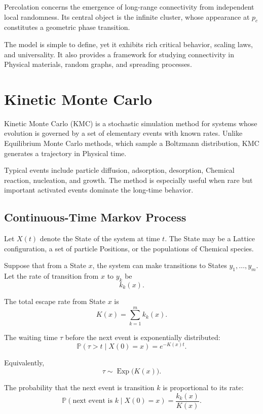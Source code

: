 \documentclass[a4paper, 10pt, onepage]{elegantbook}
\begin{document}
{Percolation concerns the emergence of long-range connectivity from independent
local randomness. Its central object is the infinite cluster, whose appearance
at \(p_c\) constitutes a geometric phase transition.

The model is simple to define, yet it exhibits rich critical behavior, scaling
laws, and universality. It also provides a  framework for studying
connectivity in Physical materials, random graphs, and spreading processes.

\newpage

\section{Kinetic Monte Carlo}

Kinetic Monte Carlo (KMC) is a stochastic simulation method for systems whose
evolution is governed by a set of elementary events with known rates. Unlike
Equilibrium Monte Carlo methods, which sample a Boltzmann distribution,
KMC generates a trajectory in Physical time.

Typical events include particle diffusion, adsorption, desorption, Chemical
reaction, nucleation, and growth. The method is especially useful when rare but
important activated events dominate the long-time behavior.

\subsection{Continuous-Time Markov Process}

Let \(X(t)\) denote the State of the system at time \(t\). The State may be a
Lattice configuration, a set of particle Positions, or the populations of
Chemical species.

Suppose that from a State \(x\), the system can make transitions to States
\(y_1,\ldots,y_m\). Let the rate of transition from \(x\) to \(y_k\) be
\[
k_k(x).
\]

The total escape rate from State \(x\) is
\[
K(x)
=
\sum_{k=1}^m k_k(x).
\]

The waiting time \(\tau\) before the next event is exponentially distributed:
\[
\mathbb P(\tau>t\mid X(0)=x)
=
e^{-K(x)t}.
\]

Equivalently,
\[
\tau
\sim
\operatorname{Exp}\bigl(K(x)\bigr).
\]

The probability that the next event is transition \(k\) is proportional to its
rate:
\[
\mathbb P(\text{next event is }k\mid X(0)=x)
=
\frac{k_k(x)}{K(x)}.
\]

}
\end{document}
